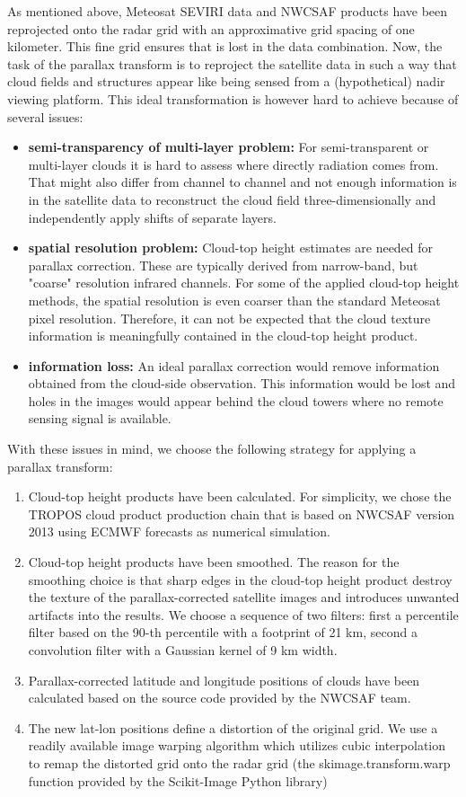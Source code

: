 As mentioned above, Meteosat SEVIRI data and NWCSAF products have been reprojected onto the radar grid with an approximative grid spacing of one kilometer. This fine grid ensures that  is lost in the data combination. Now, the task of the parallax transform is to reproject the satellite data in such a way that cloud fields and structures appear like being sensed from a (hypothetical) nadir viewing platform. This ideal transformation is however hard to achieve because of several issues:
\begin{itemize}
\item \textbf{semi-transparency of multi-layer problem:} For semi-transparent or multi-layer clouds it is hard to assess where directly radiation comes from. That might also differ from channel to channel and not enough information is in the satellite data to reconstruct the cloud field three-dimensionally and independently apply shifts of separate layers.
\item \textbf{spatial resolution problem:} Cloud-top height estimates are needed for parallax correction. These are typically derived from narrow-band, but "coarse" resolution infrared channels. For some of the applied cloud-top height methods, the spatial resolution is even coarser than the standard Meteosat pixel resolution. Therefore, it can not be expected that the cloud texture information is meaningfully contained in the cloud-top height product. 
\item \textbf{information loss:} An ideal parallax correction would remove information obtained from the cloud-side observation. This information would be lost and holes in the images would appear behind the cloud towers where no remote sensing signal is available.
\end{itemize}
With these issues in mind, we choose the following strategy for applying a parallax transform:
\begin{enumerate}
\item Cloud-top height products have been calculated. For simplicity, we chose the TROPOS cloud product production chain that is based on NWCSAF version 2013 using ECMWF forecasts as numerical simulation.
\item Cloud-top height products have been smoothed. The reason for the smoothing choice is that sharp edges in the cloud-top height product destroy the texture of the parallax-corrected satellite images and introduces unwanted artifacts into the results. We choose a sequence of two filters: first a percentile filter based on the 90-th percentile with a footprint of 21 km, second a convolution filter with a Gaussian kernel of 9 km width.
\item Parallax-corrected latitude and longitude positions of clouds have been calculated based on the source code provided by the NWCSAF team.
\item The new lat-lon positions define a distortion of the original grid. We use a readily available image warping algorithm which utilizes cubic interpolation to remap the distorted grid onto the radar grid (the skimage.transform.warp function provided by the Scikit-Image Python library)  
\end{enumerate}

